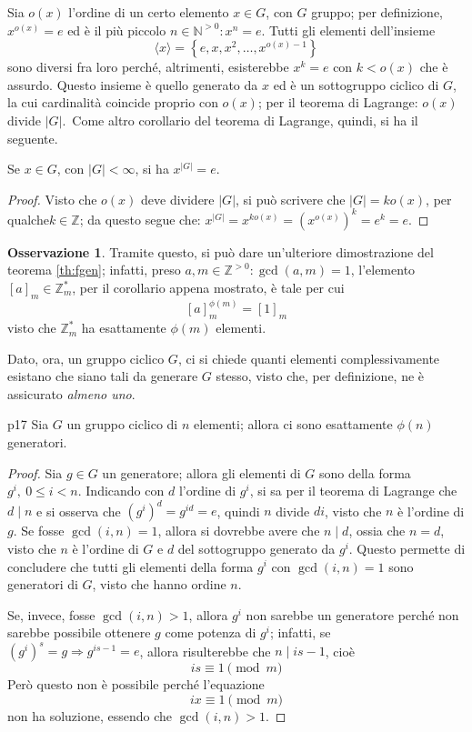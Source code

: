 \documentclass[11pt, a4paper]{scrartcl}
\theoremstyle{definition}
\numberwithin{esempio}{section}
\theoremstyle{definition}
\newtheorem{obs}{Osservazione}
\numberwithin{obs}{section}
\numberwithin{nota}{section}
\numberwithin{equation}{subsection}
\begin{document}
Sia $o(x)$ l'ordine di un certo elemento $x \in G$, con $G$ gruppo; per definizione, $x^{o(x)} = e$ ed \`e il pi\`u piccolo $n \in \mathbb{N}^{>0}  : x^n = e$.
Tutti gli elementi dell'insieme
\[
\langle x \rangle=\left\{ e , x ,x^2 ,\ldots, x^{o(x) -1}  \right\} 
\] 
sono diversi fra loro perch\'e, altrimenti, esisterebbe $x^k =e$ con $k<o(x)$ che \`e assurdo.
Questo insieme \`e quello generato da $x$ ed \`e un sottogruppo ciclico di $G$, la cui cardinalit\`a coincide proprio con $o(x)$; per il teorema di Lagrange: $o(x) $ divide $ \lvert G \rvert $.\
Come altro corollario del teorema di Lagrange, quindi, si ha il seguente.
\begin{corollario}
	{}{}
	Se $x \in G$, con $|G| < \infty$, si ha $x^{|G|} =e $.
	\begin{proof}
		Visto che $o(x)$ deve dividere $|G|$, si pu\`o scrivere che $|G| =k o(x)$, per qualche$ k \in \mathbb{Z}$; da questo segue che: $x^{|G|}  = x ^{k o(x)} = \left(x^{o(x)} \right) ^k= e^k = e$.
	\end{proof}
\end{corollario}
\begin{obs}
Tramite questo, si pu\`o dare un'ulteriore dimostrazione del teorema \ref{th:fgen}; infatti, preso $a,m \in \mathbb{Z}^{>0} : \operatorname{gcd}(a,m) =1$, l'elemento $[a]_m \in \mathbb{Z}^*_m$, per il corollario appena mostrato, \`e tale per cui
\[
	[a]_m^{\phi (m)} = [1]_m
\] 
visto che $\mathbb{Z}^*_m$ ha esattamente $\phi (m)$ elementi.
\end{obs}
Dato, ora, un gruppo ciclico $G$, ci si chiede quanti elementi complessivamente esistano che siano tali da generare $G$ stesso, visto che, per definizione, ne \`e assicurato \textit{almeno uno}.
\begin{prop}
	{}{p17}
	Sia $G$ un gruppo ciclico di $n$ elementi; allora ci sono esattamente $\phi (n)$ generatori.
	\begin{proof}
		Sia $g \in G$ un generatore; allora gli elementi di $G$ sono della forma $g^i, \ 0\le i <n $. 
		Indicando con $d$ l'ordine di $g^i$, si sa per il teorema di Lagrange che $d  \mid n$ e si osserva che $(g^i)^d = g^{id} =e$, quindi $n$ divide $di$, visto che $n$ \`e l'ordine di $g$.
		Se fosse $\operatorname{gcd}(i,n) =1$, allora si dovrebbe avere che $n  \mid  d$, ossia che $n = d$, visto che $n$ \`e l'ordine di $G$ e $d$ del sottogruppo generato da $g^i$.
		Questo permette di concludere che tutti gli elementi della forma $g^i$ con $\operatorname{gcd}(i,n) =1$ sono generatori di $G$, visto che hanno ordine $n$.

		Se, invece, fosse $\operatorname{gcd}(i,n) >1$, allora $g^i$ non sarebbe un generatore perch\'e non sarebbe possibile ottenere $g$ come potenza di $g^i$; infatti, se $(g^i)^s = g \Rightarrow  g^{is -1 }  = e$, allora risulterebbe che $n  \mid is -1$, cio\`e 
		\[
		is \equiv 1\pmod{m} 
		\] 
		Per\`o questo non \`e possibile perch\'e l'equazione 
		\[
		ix \equiv 1 \pmod{m} 
		\] 
		non ha soluzione, essendo che $\operatorname{gcd}(i,n) >1$.
	\end{proof}
\end{prop}
\end{document}
